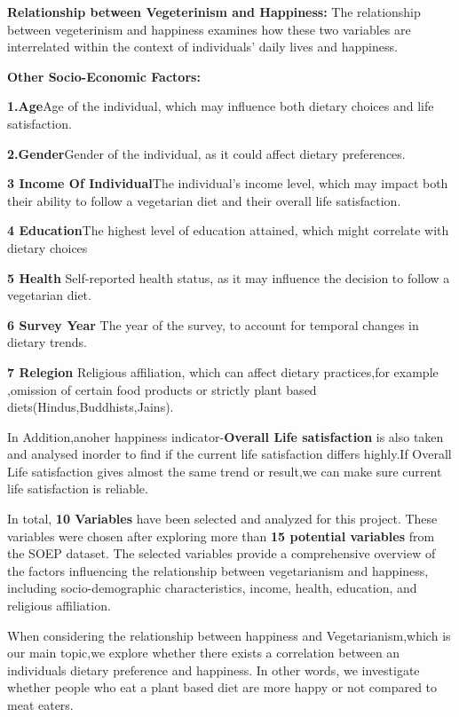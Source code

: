 \documentclass[
]{article}
\begin{document}
\textbf{Relationship between Vegeterinism and Happiness:} The
relationship between vegeterinism and happiness examines how these two
variables are interrelated within the context of individuals' daily
lives and happiness.

\textbf{Other Socio-Economic Factors:}

\textbf{1.Age}Age of the individual, which may influence both dietary
choices and life satisfaction.

\textbf{2.Gender}Gender of the individual, as it could affect dietary
preferences.

\textbf{3 Income Of Individual}The individual's income level, which may
impact both their ability to follow a vegetarian diet and their overall
life satisfaction.

\textbf{4 Education}The highest level of education attained, which might
correlate with dietary choices

\textbf{5 Health }Self-reported health status, as it may influence the
decision to follow a vegetarian diet.

\textbf{6 Survey Year }The year of the survey, to account for temporal
changes in dietary trends.

\textbf{7 Relegion }Religious affiliation, which can affect dietary
practices,for example ,omission of certain food products or strictly
plant based diets(Hindus,Buddhists,Jains).

In Addition,anoher happiness indicator-\textbf{Overall Life
satisfaction} is also taken and analysed inorder to find if the current
life satisfaction differs highly.If Overall Life satisfaction gives
almost the same trend or result,we can make sure current life
satisfaction is reliable.

In total, \textbf{10 Variables} have been selected and analyzed for this
project. These variables were chosen after exploring more than
\textbf{15 potential variables} from the SOEP dataset. The selected
variables provide a comprehensive overview of the factors influencing
the relationship between vegetarianism and happiness, including
socio-demographic characteristics, income, health, education, and
religious affiliation.

When considering the relationship between happiness and
Vegetarianism,which is our main topic,we explore whether there exists a
correlation between an individuals dietary preference and happiness. In
other words, we investigate whether people who eat a plant based diet
are more happy or not compared to meat eaters.
\end{document}

